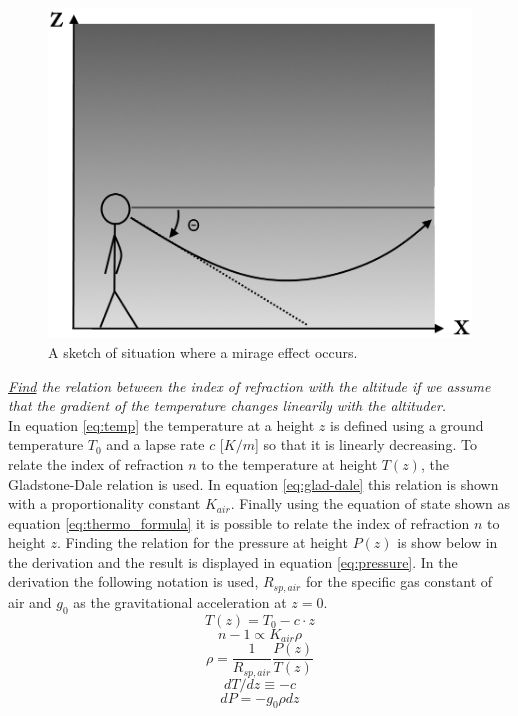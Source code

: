 \documentclass{article}
\begin{document}
\begin{figure}[h!]
	\centering
	\includegraphics[width=0.4\linewidth,keepaspectratio]{afbeeldingen/miraaj.png}
	\caption{A sketch of situation where a mirage effect occurs.}
	\label{fig:mirage}
\end{figure}


\textit{\underline{Find} the relation between the index of refraction with the altitude if we assume that the gradient of the temperature changes linearily with the altituder.}\\
In equation \ref{eq:temp} the temperature at a height $z$ is defined using a ground temperature $T_0$ and a lapse rate $c$ [$K /m$] so that it is linearly decreasing. To relate the index of refraction $n$ to the temperature at height $T(z)$, the Gladstone-Dale relation is used. In equation \ref{eq:glad-dale} this relation is shown with a proportionality constant $K_{air}$. Finally using the equation of state shown as equation \ref{eq:thermo_formula} it is possible to relate the index of refraction $n$ to height $z$. Finding the relation for the pressure at height $P(z)$ is show below in the derivation and the result is displayed in equation \ref{eq:pressure}. In the derivation the following notation is used, $R_{sp,air}$ for the specific gas constant of air and $g_0$ as the gravitational acceleration at $z=0$.\\
\begin{equation}
	T(z) = T_0 - c \cdot z
	\label{eq:temp}
\end{equation}
\begin{equation}
	n-1 \propto K_{air} \rho
	\label{eq:glad-dale}
\end{equation}
\begin{equation}
	\rho = \frac{1}{R_{sp,air}} \frac{P(z)}{T(z)}
	\label{eq:thermo_formula}
\end{equation}
\begin{equation*}
	dT/dz \equiv -c
\end{equation*}
\begin{equation*}
	dP = -g_0 \rho dz
\end{equation*}
\end{document}

